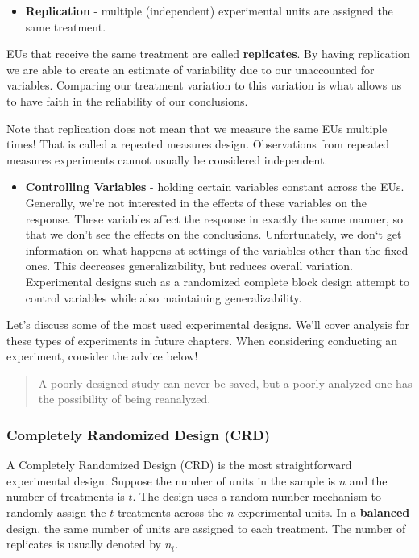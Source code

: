 \documentclass[
]{book}
\providecommand{\tightlist}{%
  \setlength{\itemsep}{0pt}\setlength{\parskip}{0pt}}
\theoremstyle{definition}
\theoremstyle{definition}
\theoremstyle{definition}
\theoremstyle{remark}
\begin{document}
\begin{itemize}
\tightlist
\item
  \textbf{Replication} - multiple (independent) experimental units are assigned the same treatment.
\end{itemize}

EUs that receive the same treatment are called \textbf{replicates}. By having replication we are able to create an estimate of variability due to our unaccounted for variables. Comparing our treatment variation to this variation is what allows us to have faith in the reliability of our conclusions.

Note that replication does not mean that we measure the same EUs multiple times! That is called a repeated measures design. Observations from repeated measures experiments cannot usually be considered independent.

\begin{itemize}
\tightlist
\item
  \textbf{Controlling Variables} - holding certain variables constant across the EUs.\\
  Generally, we're not interested in the effects of these variables on the response. These variables affect the response in exactly the same manner, so that we don't see the effects on the conclusions. Unfortunately, we don`t get information on what happens at settings of the variables other than the fixed ones. This decreases generalizability, but reduces overall variation. Experimental designs such as a randomized complete block design attempt to control variables while also maintaining generalizability.
\end{itemize}

Let's discuss some of the most used experimental designs. We'll cover analysis for these types of experiments in future chapters. When considering conducting an experiment, consider the advice below!

\begin{quote}
A poorly designed study can never be saved, but a poorly analyzed one has the possibility of being reanalyzed.
\end{quote}

\hypertarget{completely-randomized-design-crd}{%
\subsubsection{Completely Randomized Design (CRD)}\label{completely-randomized-design-crd}}

A Completely Randomized Design (CRD) is the most straightforward experimental design. Suppose the number of units in the sample is \(n\) and the number of treatments is \(t\). The design uses a random number mechanism to randomly assign the \(t\) treatments across the \(n\) experimental units. In a \textbf{balanced} design, the same number of units are assigned to each treatment. The number of replicates is usually denoted by \(n_t\).
\end{document}

